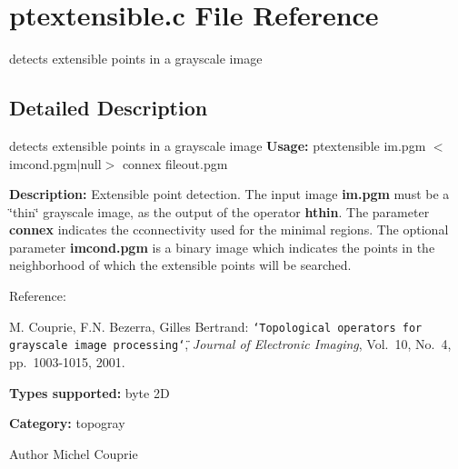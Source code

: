 \section{ptextensible.c File Reference}
\label{ptextensible_8c}


detects extensible points in a grayscale image  




\subsection{Detailed Description}
detects extensible points in a grayscale image {\bfseries Usage:} ptextensible im.pgm $<$imcond.pgm$|$null$>$ connex fileout.pgm

{\bfseries Description:} Extensible point detection. The input image {\bfseries im.pgm} must be a \char`\"{}thin\char`\"{} grayscale image, as the output of the operator {\bfseries hthin}. The parameter {\bfseries connex} indicates the cconnectivity used for the minimal regions. The optional parameter {\bfseries imcond.pgm} is a binary image which indicates the points in the neighborhood of which the extensible points will be searched.

Reference:\par
 M. Couprie, F.N. Bezerra, Gilles Bertrand: {\tt \char`\"{}Topological operators for
grayscale image processing\char`\"{}}, {\itshape  Journal of Electronic Imaging\/}, Vol.~10, No.~4, pp.~1003-\/1015, 2001.

{\bfseries Types supported:} byte 2D

{\bfseries Category:} topogray

\begin{DoxyAuthor}{Author}
Michel Couprie 
\end{DoxyAuthor}
